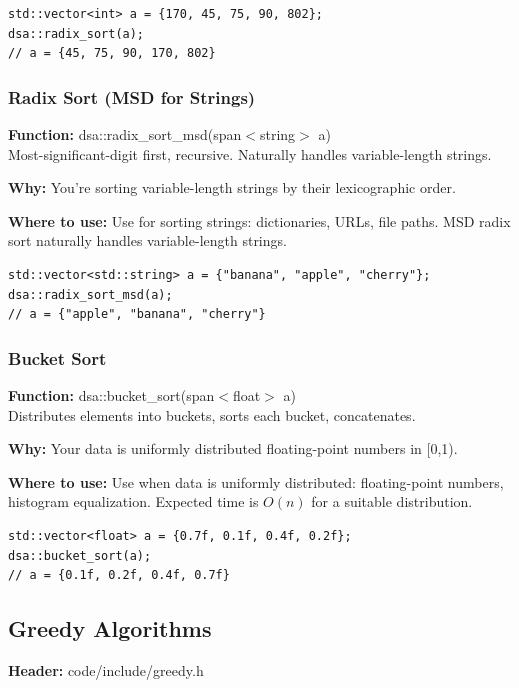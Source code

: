 \documentclass[11pt]{article}
\begin{document}
\begin{lstlisting}
std::vector<int> a = {170, 45, 75, 90, 802};
dsa::radix_sort(a);
// a = {45, 75, 90, 170, 802}
\end{lstlisting}

\subsubsection{Radix Sort (MSD for Strings)}
\textbf{Function:} dsa::radix\_sort\_msd(span$<$string$>$ a)\\

Most-significant-digit first, recursive. Naturally handles variable-length strings.

\textbf{Why:} You're sorting variable-length strings by their lexicographic order. \par \textbf{Where to use:} Use for sorting strings: dictionaries, URLs, file paths. MSD radix sort naturally handles variable-length strings.

\begin{lstlisting}
std::vector<std::string> a = {"banana", "apple", "cherry"};
dsa::radix_sort_msd(a);
// a = {"apple", "banana", "cherry"}
\end{lstlisting}

\subsubsection{Bucket Sort}
\textbf{Function:} dsa::bucket\_sort(span$<$float$>$ a)\\

Distributes elements into buckets, sorts each bucket, concatenates.

\textbf{Why:} Your data is uniformly distributed floating-point numbers in [0,1). \par \textbf{Where to use:} Use when data is uniformly distributed: floating-point numbers, histogram equalization. Expected time is \(O(n)\) for a suitable distribution.

\begin{lstlisting}
std::vector<float> a = {0.7f, 0.1f, 0.4f, 0.2f};
dsa::bucket_sort(a);
// a = {0.1f, 0.2f, 0.4f, 0.7f}
\end{lstlisting}

\subsection{Greedy Algorithms}
\textbf{Header:} code/include/greedy.h
\end{document}
